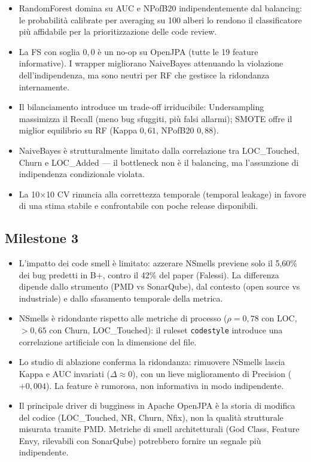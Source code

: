 \begin{itemize}
    \item RandomForest domina su AUC e NPofB20 indipendentemente dal balancing: le
    probabilità calibrate per averaging su 100 alberi lo rendono il classificatore più
    affidabile per la prioritizzazione delle code review.

    \item La FS con soglia $0{,}0$ è un no-op su OpenJPA (tutte le 19 feature
    informative). I wrapper migliorano NaiveBayes attenuando la violazione dell'indipendenza,
    ma sono neutri per RF che gestisce la ridondanza internamente.

    \item Il bilanciamento introduce un trade-off irriducibile: Undersampling massimizza
    il Recall (meno bug sfuggiti, più falsi allarmi); SMOTE offre il miglior equilibrio
    su RF (Kappa $0{,}61$, NPofB20 $0{,}88$).

    \item NaiveBayes è strutturalmente limitato dalla correlazione tra LOC\_Touched, Churn
    e LOC\_Added --- il bottleneck non è il balancing, ma l'assunzione di indipendenza
    condizionale violata.

    \item La 10$\times$10 CV rinuncia alla correttezza temporale (temporal leakage) in
    favore di una stima stabile e confrontabile con poche release disponibili.
\end{itemize}

\subsection{Milestone 3}

\begin{itemize}
    \item L'impatto dei code smell è limitato: azzerare NSmells previene solo il 5,60\%
    dei bug predetti in B+, contro il 42\% del paper (Falessi). La differenza dipende
    dallo strumento (PMD vs SonarQube), dal contesto (open source vs industriale) e dallo
    sfasamento temporale della metrica.

    \item NSmells è ridondante rispetto alle metriche di processo ($\rho = 0{,}78$ con
    LOC, $> 0{,}65$ con Churn, LOC\_Touched): il ruleset \texttt{codestyle} introduce
    una correlazione artificiale con la dimensione del file.

    \item Lo studio di ablazione conferma la ridondanza: rimuovere NSmells lascia Kappa
    e AUC invariati ($\Delta \approx 0$), con un lieve miglioramento di Precision
    ($+0{,}004$). La feature è rumorosa, non informativa in modo indipendente.

    \item Il principale driver di bugginess in Apache OpenJPA è la storia di modifica
    del codice (LOC\_Touched, NR, Churn, Nfix), non la qualità strutturale misurata
    tramite PMD. Metriche di smell architetturali (God Class, Feature Envy, rilevabili
    con SonarQube) potrebbero fornire un segnale più indipendente.
\end{itemize}


